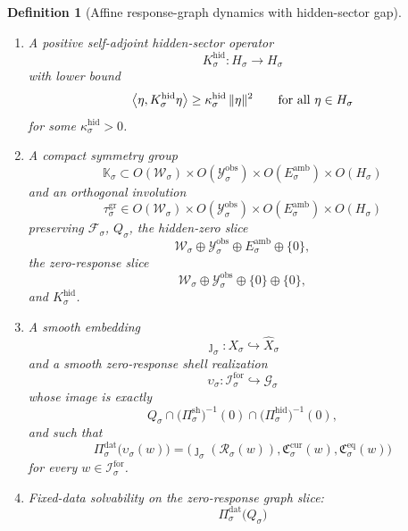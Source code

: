 \documentclass[11pt]{article}
\newcommand{\ForSpace}[1]{\mathcal I_{#1}^{\mathrm{for}}}
\newcommand{\Reduction}[1]{\mathcal R_{#1}}
\newcommand{\CurrentCarrier}[1]{\mathfrak C_{#1}^{\mathrm{cur}}}
\newcommand{\EqCarrier}[1]{\mathfrak C_{#1}^{\mathrm{eq}}}
\newcommand{\VisibleAffine}[1]{\widehat X_{#1}}
\newcommand{\DataSpace}[1]{\mathcal Y_{#1}^{\mathrm{obs}}}
\newcommand{\AmbientTarget}[1]{E_{#1}^{\mathrm{amb}}}
\newcommand{\GapSpace}[1]{H_{#1}}
\newcommand{\GapBody}[1]{D_{#1}}
\newcommand{\HiddenOperator}[1]{K_{#1}^{\mathrm{hid}}}
\newcommand{\GraphState}[1]{\mathcal W_{#1}}
\newcommand{\GraphSpace}[1]{\mathcal G_{#1}}
\newcommand{\GraphAffine}[1]{\mathcal F_{#1}}
\newcommand{\GraphBody}[1]{Q_{#1}}
\newcommand{\GraphZeroBody}[1]{Q_{#1}^{0}}
\newcommand{\GraphDataProj}[1]{\Pi_{#1}^{\mathrm{dat}}}
\newcommand{\GraphShellProj}[1]{\Pi_{#1}^{\mathrm{sh}}}
\newcommand{\GraphHiddenProj}[1]{\Pi_{#1}^{\mathrm{hid}}}
\newcommand{\GraphSym}[1]{\mathbb K_{#1}}
\newcommand{\GraphTime}[1]{\tau_{#1}^{\mathrm{gr}}}
\newcommand{\GraphEmbed}[1]{\upsilon_{#1}}
\newtheorem{definition}{Definition}
\begin{document}
\begin{definition}[Affine response-graph dynamics with hidden-sector gap]
\begin{enumerate}
\begin{equation}
    \label{eq:graphsplit}
    \end{equation}
    is a bijection from \(\GraphZeroBody{\sigma}\times \GapBody{\sigma}\) onto \(\GraphBody{\sigma}\).
    \item A positive self-adjoint hidden-sector operator
    \[
    \HiddenOperator{\sigma}:\GapSpace{\sigma}\to\GapSpace{\sigma}
    \]
    with lower bound
    \begin{equation}
    \ev{\eta,\HiddenOperator{\sigma}\eta}
    \ge
    \kappa_{\sigma}^{\mathrm{hid}}\,
    \|\eta\|^{2}
    \qquad
    \text{for all }\eta\in\GapSpace{\sigma}
    \label{eq:graphgap}
    \end{equation}
    for some \(\kappa_{\sigma}^{\mathrm{hid}}>0\).
    \item A compact symmetry group
    \[
    \GraphSym{\sigma}\subset
    O(\GraphState{\sigma})\times
    O(\DataSpace{\sigma})\times
    O(\AmbientTarget{\sigma})\times
    O(\GapSpace{\sigma})
    \]
    and an orthogonal involution
    \[
    \GraphTime{\sigma}\in
    O(\GraphState{\sigma})\times
    O(\DataSpace{\sigma})\times
    O(\AmbientTarget{\sigma})\times
    O(\GapSpace{\sigma})
    \]
    preserving \(\GraphAffine{\sigma}\), \(\GraphBody{\sigma}\), the hidden-zero slice
    \[
    \GraphState{\sigma}\oplus \DataSpace{\sigma}\oplus \AmbientTarget{\sigma}\oplus\{0\},
    \]
    the zero-response slice
    \[
    \GraphState{\sigma}\oplus \DataSpace{\sigma}\oplus\{0\}\oplus\{0\},
    \]
    and \(\HiddenOperator{\sigma}\).
    \item A smooth embedding
    \[
    \jmath_{\sigma}:X_{\sigma}\hookrightarrow \VisibleAffine{\sigma}
    \]
    and a smooth zero-response shell realization
    \[
    \GraphEmbed{\sigma}:\ForSpace{\sigma}\hookrightarrow \GraphSpace{\sigma}
    \]
    whose image is exactly
    \[
    \GraphBody{\sigma}\cap
    \bigl(\GraphShellProj{\sigma}\bigr)^{-1}(0)\cap
    \bigl(\GraphHiddenProj{\sigma}\bigr)^{-1}(0),
    \]
    and such that
    \begin{equation}
    \GraphDataProj{\sigma}\bigl(\GraphEmbed{\sigma}(w)\bigr)
    =
    \bigl(
    \jmath_{\sigma}(\Reduction{\sigma}(w)),
    \CurrentCarrier{\sigma}(w),
    \EqCarrier{\sigma}(w)
    \bigr)
    \label{eq:graphcompat}
    \end{equation}
    for every \(w\in\ForSpace{\sigma}\).
    \item Fixed-data solvability on the zero-response graph slice:
    \begin{equation}
    \GraphDataProj{\sigma}\bigl(\GraphBody{\sigma}\bigr)

\end{equation}
\end{enumerate}
\end{definition}
\end{document}
